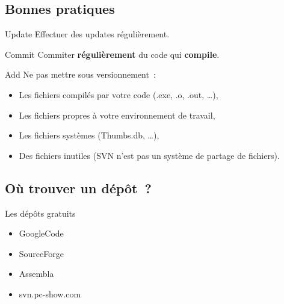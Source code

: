 \subsection{Bonnes pratiques}
\begin{frame}
  \begin{alertblock}{Update}
    Effectuer des updates régulièrement.
  \end{alertblock}
  \begin{alertblock}{Commit}
    Commiter \textbf{régulièrement} du code qui \textbf{compile}.
  \end{alertblock}
  \begin{alertblock}{Add}
    Ne pas mettre sous versionnement~:
    \begin{itemize}
    \item Les fichiers compilés par votre code (.exe, .o, .out, \ldots),
    \item Les fichiers propres à votre environnement de travail,
    \item Les fichiers systèmes (Thumbs.db, \ldots),
    \item Des fichiers inutiles (SVN n'est pas un système de partage de fichiers).
    \end{itemize}
  \end{alertblock}
\end{frame}

\subsection{Où trouver un dépôt~?}
\begin{frame}
  \begin{exampleblock}{Les dépôts gratuits}
    \begin{itemize}
    \item GoogleCode
    \item SourceForge
    \item Assembla
    \item svn.pc-show.com
    \end{itemize}
  \end{exampleblock}
\end{frame}
